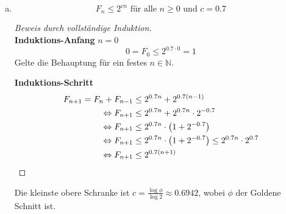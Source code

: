 \documentclass[a4paper]{scrartcl}
\begin{document}
\begin{enumerate}[(a)]
    \item
        \begin{behaupt}
            \begin{equation}
                F_n \leq 2^{cn} \text{ für alle } n \geq 0 \text{ und } c = \num{0,7}
            \end{equation}
        \end{behaupt}
        \begin{proof}[Beweis durch vollständige Induktion] \hfill \\
            \textbf{Induktions-Anfang} $n = 0$ \\
            \begin{equation}
                0 = F_0 \leq 2^{\num{0.7} \cdot 0} = 1
            \end{equation}
            Gelte die Behauptung für ein festes $n \in \mathbb{N}$.

            \textbf{Induktions-Schritt} \\
            \begin{equation}
                \begin{split}
                    F_{n+1} = F_n + F_{n-1} &\leq 2^{\num{0,7}n} + 2^{\num{0,7}(n-1)} \\
                    \Leftrightarrow F_{n+1} &\leq 2^{\num{0,7}n} + 2^{\num{0,7}n} \cdot 2^{\num{-0,7}} \\
                    \Leftrightarrow F_{n+1} &\leq 2^{\num{0,7}n} \cdot \left( 1 + 2^{\num{-0,7}} \right) \\
                    \Leftrightarrow F_{n+1} &\leq 2^{\num{0,7}n} \cdot \left( 1 + 2^{\num{-0,7}} \right) \leq 2^{\num{0,7}n} \cdot 2^{\num{0,7}} \\
                    \Leftrightarrow F_{n+1} &\leq 2^{\num{0,7}(n+1)} \\
                \end{split}
            \end{equation}
        \end{proof}
        Die kleinste obere Schranke ist
        $c = \frac{\log \phi}{\log 2} \approx \num{0.6942}$,
        wobei $\phi$ der Goldene Schnitt ist.
\end{enumerate}
\end{document}

